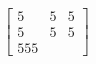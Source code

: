 \documentclass{article}
\begin{document}
\[
	\begin{bmatrix} 5 & 5 & 5 \\
                5 & 5 & 5 \\
                5 5 5
	\end{bmatrix}
\]
\end{document}
